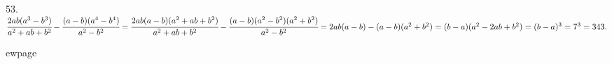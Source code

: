 53. $\cfrac{2ab(a^3-b^3)}{a^2+ab+b^2}-\cfrac{(a-b)(a^4-b^4)}{a^2-b^2}=
\cfrac{2ab(a-b)(a^2+ab+b^2)}{a^2+ab+b^2}-\cfrac{(a-b)(a^2-b^2)(a^2+b^2)}{a^2-b^2}=
2ab(a-b)-(a-b)(a^2+b^2)=(b-a)(a^2-2ab+b^2)=(b-a)^3=7^3=343.$

ewpage
